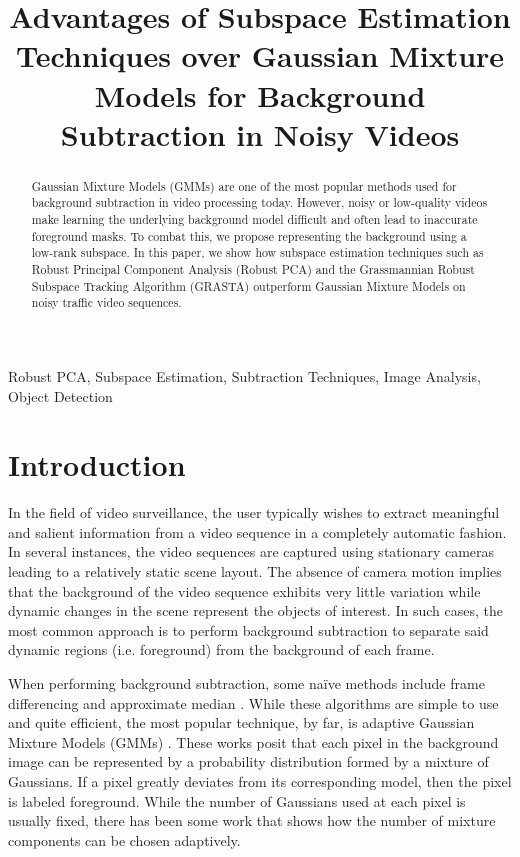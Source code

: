 \documentclass{article}
\title{Advantages of Subspace Estimation Techniques over Gaussian Mixture Models for Background Subtraction in Noisy Videos}
\begin{document}
%
\maketitle
%
\begin{abstract}
Gaussian Mixture Models (GMMs) are one of the most popular methods used for background subtraction in video processing today. However, noisy or low-quality videos make learning the underlying background model difficult and often lead to inaccurate foreground masks. To combat this, we propose representing the background using a low-rank subspace. In this paper, we show how subspace estimation techniques such as Robust Principal Component Analysis (Robust PCA) and the Grassmannian Robust Subspace Tracking Algorithm  (GRASTA) outperform Gaussian Mixture Models on noisy traffic video sequences.
\end{abstract}
%
\begin{keywords}
Robust PCA, Subspace Estimation,  Subtraction Techniques, Image Analysis, Object Detection
\end{keywords}
%

\vspace{0.1in}

\section{Introduction}
In the field of video surveillance, the user typically wishes to extract meaningful and salient information from a video sequence in a completely automatic fashion. In several instances, the video sequences are captured using stationary cameras leading to a relatively static scene layout. The absence of camera motion implies that the background of the video sequence exhibits very little variation while dynamic changes in the scene represent the objects of interest. In such cases, the most common approach is to perform background subtraction to separate said dynamic regions (i.e. foreground) from the background of each frame.

When performing background subtraction, some na\"ive methods include frame differencing and approximate median \cite{approxMed}. %
While these algorithms are simple to use and quite efficient, the most popular technique, by far, is adaptive  Gaussian Mixture Models (GMMs) \cite{FriedmanGMM, StaufferGMM}. These works posit that each pixel in the background image can be represented by a probability distribution formed by a mixture of Gaussians. If a pixel greatly deviates from its corresponding model, then the pixel is labeled foreground. While the number of Gaussians used at each pixel is usually fixed, there has been some work \cite{ZivGMM} that shows how the number of mixture components can be chosen adaptively.
\end{document}
